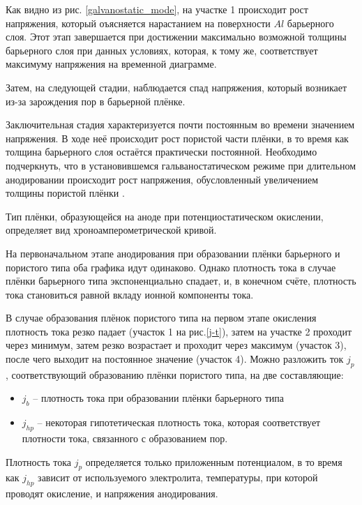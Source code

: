 Как видно из рис. \ref{galvanostatic_mode}, на участке 1 происходит рост напряжения, который оъясняется нарастанием на поверхности $Al$ барьерного слоя. Этот этап завершается при достижении максимально возможной толщины барьерного слоя при данных условиях, которая, к тому же, соответствует максимуму напряжения на временной диаграмме.

Затем, на следующей стадии, наблюдается спад напряжения, который возникает из-за зарождения пор в барьерной плёнке.

Заключительная стадия характеризуется почти постоянным во времени значением напряжения. В ходе неё происходит рост пористой части плёнки, в то время как толщина барьерного слоя остаётся практически постоянной. Необходимо подчеркнуть, что в установившемся гальваностатическом режиме при длительном анодировании происходит рост напряжения, обусловленный увеличением толщины пористой плёнки \cite{atraschenko-hyperbolyc}.

Тип плёнки, образующейся на аноде при потенциостатическом окислении, определяет вид хроноамперометрической кривой.

На первоначальном этапе анодирования при образовании плёнки барьерного и пористого типа оба графика идут одинаково. Однако плотность тока в случае плёнки барьерного типа экспоненциально спадает, и, в конечном счёте, плотность тока становиться равной вкладу ионной компоненты тока.

В случае образования плёнок пористого типа на первом этапе окисления плотность тока резко падает (участок 1 на рис.\ref{j-t}), затем на участке 2 проходит через минимум, затем резко возрастает и проходит через максимум (участок 3), после чего выходит на постоянное значение (участок 4). Можно разложить ток $j_p$, соответствующий образованию плёнки пористого типа, на две составляющие:
\begin{itemize}
    \item $j_b$ – плотность тока при образовании плёнки барьерного типа
    \item $j_{hp}$ – некоторая гипотетическая плотность тока, которая соответствует плотности тока, связанного с образованием пор.
\end{itemize}
Плотность тока $j_p$ определяется только приложенным потенциалом, в то время как $j_{hp}$ зависит от используемого электролита, температуры, при которой проводят окисление, и напряжения анодирования.


